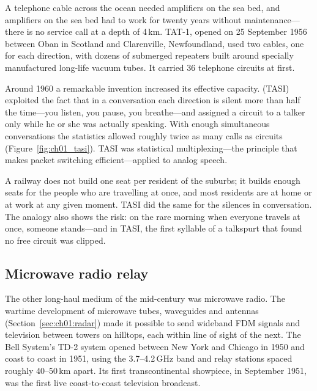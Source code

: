 A telephone cable across the ocean needed amplifiers on the sea bed, and amplifiers on the sea bed
had to work for twenty years without maintenance---there is no service call at a depth of 4\,km.
TAT-1, opened on 25 September 1956 between Oban in Scotland and Clarenville, Newfoundland, used two
cables, one for each direction, with dozens of submerged repeaters built around specially
manufactured long-life vacuum tubes. It carried 36 telephone circuits at first.

Around 1960 a remarkable invention increased its effective capacity.  (TASI) exploited the fact that in a conversation each direction is silent more than
half the time---you listen, you pause, you breathe---and assigned a circuit to a talker only while he
or she was actually speaking. With enough simultaneous conversations the statistics allowed roughly
twice as many calls as circuits (Figure~\ref{fig:ch01_tasi}). TASI was statistical
multiplexing---the principle that makes packet switching efficient---applied to analog speech.


\begin{analogy}
A railway does not build one seat per resident of the suburbs; it builds enough seats for the people
who are travelling at once, and most residents are at home or at work at any given moment. TASI did
the same for the silences in conversation. The analogy also shows the risk: on the rare morning when
everyone travels at once, someone stands---and in TASI, the first syllable of a talkspurt that found
no free circuit was clipped.
\end{analogy}

\subsection{Microwave radio relay}

The other long-haul medium of the mid-century was microwave radio. The wartime development of
microwave tubes, waveguides and antennas (Section~\ref{sec:ch01:radar}) made it possible to send
wideband FDM signals and television between towers on hilltops, each within line of sight of the next.
The Bell System's TD-2 system opened between New York and Chicago in 1950 and coast to coast in 1951,
using the 3.7--4.2\,GHz band and relay stations spaced roughly 40--50\,km apart. Its first
transcontinental showpiece, in September 1951, was the first live coast-to-coast television broadcast.


